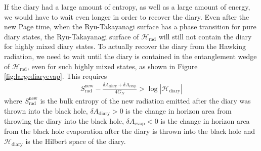 \documentclass[12pt]{article}
\begin{document}
If the diary had a large amount of entropy, as well as a large amount of energy, we would have to wait even longer in order to recover the diary. Even after the new Page time, when the Ryu-Takayanagi surface has a phase transition for pure diary states, the Ryu-Takayanagi surface of $\mathcal{H}_\text{rad}$ will still not contain the diary for highly mixed diary states. To actually recover the diary from the Hawking radiation, we need to wait until the diary is contained in the entanglement wedge of $\mathcal{H}_\text{rad}$, even for such highly mixed states, as shown in Figure \ref{fig:largediaryevap}. This requires
\begin{align} \label{eq:largediarycondition}
S_\text{rad}^\text{new} - \frac{\delta A_\text{diary} + \delta A_\text{evap}}{4G_N} > \log |\mathcal{H}_\text{diary}|
\end{align}
where $S_\text{rad}^\text{new}$ is the bulk entropy of the new radiation emitted after the diary was thrown into the black hole, $\delta A_\text{diary} > 0$ is the change in horizon area from throwing the diary into the black hole, $\delta A_\text{evap} < 0$ is the change in horizon area from the black hole evaporation after the diary is thrown into the black hole  and $\mathcal{H}_\text{diary}$ is the Hilbert space of the diary. 
\end{document}

